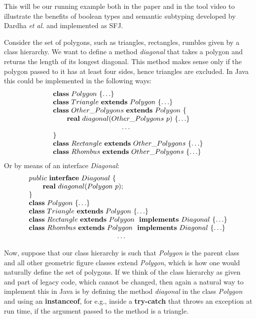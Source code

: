 \documentclass[runningheads]{llncs}
\begin{document}
\begin{example}[Polygons]
This will be our running example both in the paper and in the tool video \cite{UD20} to illustrate the benefits of boolean types and semantic subtyping developed by Dardha \emph{et al.} \cite{Dardha2013,Dardha2017} and implemented as SFJ.

Consider the set of polygons, such as triangles, rectangles, rumbles given by a class hierarchy.
We want to define a method \emph{diagonal} that takes a polygon and returns the length of its longest diagonal. This method makes sense only if the polygon passed to it has at least four sides, hence triangles are excluded.
In Java this could be implemented in the following ways:
$$
\begin{array}{l}
\synclass Polygon \ \{ \ldots\}
\\
\syndecl{Triangle}{Polygon} {\ldots}
\\
\syndecl{Other\_Polygons}{Polygon} {
\\
	\qquad \mathbf{real}\ diagonal(Other\_Polygons \ p)\ \{\ldots \}
	\\
	\hspace{3.5cm} \ldots
	\\
}
\\
\syndecl{Rectangle}{Other\_Polygons}{\ldots}
\\
\syndecl{Rhombus}{Other\_Polygons} {\ldots}
\end{array}
$$
Or by means of an interface \emph{Diagonal}:
$$
\begin{array}{l}
public \ \syninterface Diagonal\ \{
	\\
	\qquad \mathbf{real}\ diagonal(Polygon \ p);
	\\
\}
\\
\synclass Polygon \ \{\ldots\}
\\
\syndecl{Triangle}{Polygon} {\ldots}
\\
\synidecl{Rectangle}{Polygon} \synimpl Diagonal \ \{\ldots\}
\\
\synidecl{Rhombus}{Polygon} \synimpl Diagonal \ \{\ldots\}
\\
\hspace{4.5cm} \ldots
\end{array}
$$

Now, suppose that our class hierarchy is such that \emph{Polygon} is the parent class and all other geometric figure classes extend \emph{Polygon}, which is how one would naturally define the set of polygons.
If we think of the class hierarchy as given and part of legacy code, which cannot be changed, then again a natural way to implement this in Java is by defining the method \emph{diagonal} in the class \emph{Polygon} and using an \textbf{instanceof}, for e.g., inside a \textbf{try-catch} that throws an exception at run time, if the argument passed to the method is a triangle.


\end{example}
\end{document}

